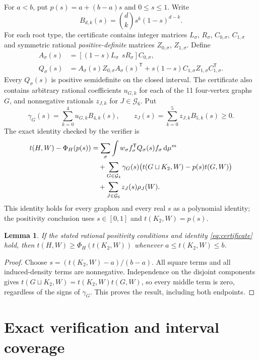 \documentclass[11pt]{article}
\newtheorem{lemma}[theorem]{Lemma}
\newcommand{\dd}{\,\mathrm d}
\begin{document}
For $a<b$, put $p(s)=a+(b-a)s$ and $0\le s\le1$.  Write
\[
 B_{d,k}(s)=\binom dk s^k(1-s)^{d-k}.
\]
For each root type, the certificate contains integer matrices $L_\sigma$,
$R_\sigma$, $C_{0,\sigma}$, $C_{1,\sigma}$ and symmetric rational
\emph{positive-definite} matrices $Z_{0,\sigma}$, $Z_{1,\sigma}$.
Define
\begin{align*}
 A_\sigma(s)&=[(1-s)L_\sigma\ \ sR_\sigma]C_{0,\sigma},\\
 Q_\sigma(s)&=A_\sigma(s)Z_{0,\sigma}A_\sigma(s)^{\mathsf T}
   +s(1-s)C_{1,\sigma}Z_{1,\sigma}C_{1,\sigma}^{\mathsf T}.
\end{align*}
Every $Q_\sigma(s)$ is positive semidefinite on the closed interval.
The certificate also contains arbitrary rational coefficients $u_{G,k}$
for each of the 11 four-vertex graphs $G$, and nonnegative rationals
$z_{J,k}$ for $J\in\mathcal G_6$.  Put
\[
 \gamma_G(s)=\sum_{k=0}^4u_{G,k}B_{4,k}(s),\qquad
 z_J(s)=\sum_{k=0}^5z_{J,k}B_{5,k}(s)\ge0.
\]
The exact identity checked by the verifier is
\begin{align}
 t(H,W)-\Phi_H(p(s))
 &=\sum_\sigma\int w_\sigma f_\sigma^{\mathsf T}
       Q_\sigma(s)f_\sigma\dd\mu^m\notag\\
 &\quad+\sum_{G\in\mathcal G_4}\gamma_G(s)
       \bigl(t(G\sqcup K_2,W)-p(s)t(G,W)\bigr)\notag\\
 &\quad+\sum_{J\in\mathcal G_6}z_J(s)\rho_J(W).
 \label{eq:certificate}
\end{align}
This identity holds for every graphon and every real $s$ as a polynomial
identity; the positivity conclusion uses $s\in[0,1]$ and $t(K_2,W)=p(s)$.

\begin{lemma}\label{lem:certificate}
If the stated rational positivity conditions and identity
\eqref{eq:certificate} hold, then $t(H,W)\ge\Phi_H(t(K_2,W))$ whenever
$a\le t(K_2,W)\le b$.
\end{lemma}
\begin{proof}
Choose $s=(t(K_2,W)-a)/(b-a)$.  All square terms and all induced-density
terms are nonnegative.  Independence on the disjoint components gives
$t(G\sqcup K_2,W)=t(K_2,W)t(G,W)$, so every middle term is zero, regardless
of the signs of $\gamma_G$.  This proves the result, including both endpoints.
\end{proof}

\section{Exact verification and interval coverage}
\end{document}
